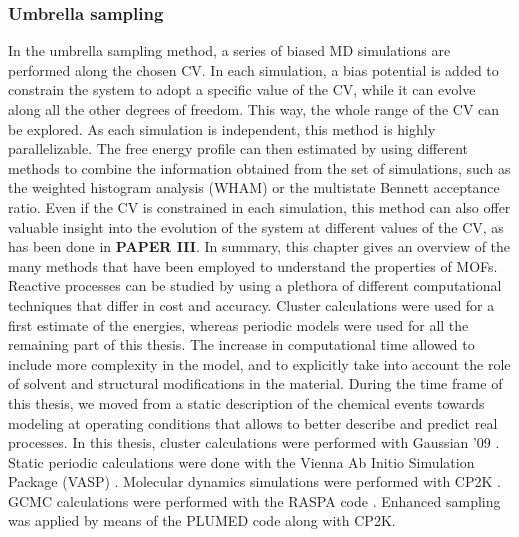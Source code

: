 \subsubsection*{Umbrella sampling}
In the umbrella sampling method, a series of biased MD simulations are performed along the chosen CV. In each simulation, a bias potential is added to constrain the system to adopt a specific value of the CV, while it can evolve along all the other degrees of freedom. This way, the whole range of the CV can be explored. As each simulation is independent, this method is highly parallelizable. The free energy profile can then estimated by using different methods to combine the information obtained from the set of simulations, such as the weighted histogram analysis (WHAM) or the multistate Bennett acceptance ratio\cite{kumar1992weighted, torrie1977nonphysical}. Even if the CV is constrained in each simulation, this method can also offer valuable insight into the evolution of the system at different values of the CV, as has been done in \textbf{PAPER III}.
\npar
\npar
\npar
\npar
\npar
In summary, this chapter gives an overview of the many methods that have been employed to understand the properties of MOFs. Reactive processes can be studied by using a plethora of different computational techniques that differ in cost and accuracy. Cluster calculations were used for a first estimate of the energies, whereas periodic models were used for all the remaining part of this thesis. The increase in computational time allowed to include more complexity in the model, and to explicitly take into account the role of solvent and structural modifications in the material. During the time frame of this thesis, we moved from a static description of the chemical events towards modeling at operating conditions that allows to better describe and predict real processes. 
\npar
In this thesis, cluster calculations were performed with Gaussian '09 \cite{frisch2015gaussian}. Static periodic calculations were done with the Vienna Ab Initio Simulation Package (VASP) \cite{kresse1996efficient, kresse1993ab, kresse1994ab, kresse1996efficiency, kresse1999ultrasoft}. Molecular dynamics simulations were performed with CP2K \cite{vandevondele2005quickstep}. GCMC calculations were performed with the RASPA code \cite{dubbeldam2016raspa}. Enhanced sampling was applied by means of the PLUMED code \cite{tribello2014plumed} along with CP2K.

\clearpage{\pagestyle{empty}\cleardoublepage}